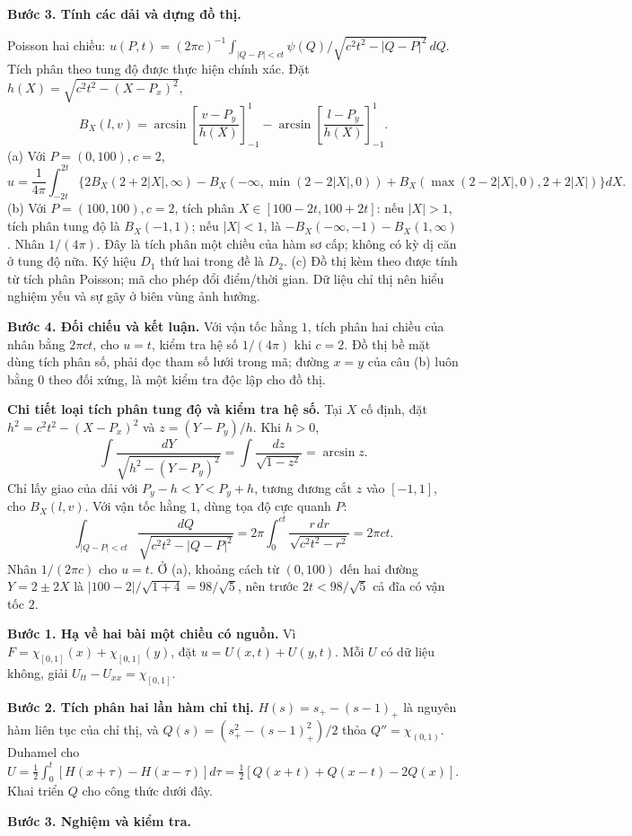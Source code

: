 \textbf{Bước 3. Tính các dải và dựng đồ thị.}

Poisson hai chiều: $u(P,t)=(2\pi c)^{-1}\int_{|Q-P|<ct}\psi(Q)/\sqrt{c^2t^2-|Q-P|^2}\,dQ$. Tích phân theo tung độ được thực hiện chính xác. Đặt $h(X)=\sqrt{c^2t^2-(X-P_x)^2}$,
\[B_X(l,v)=\arcsin\left[\frac{v-P_y}{h(X)}\right]_{-1}^1-\arcsin\left[\frac{l-P_y}{h(X)}\right]_{-1}^1.\]
(a) Với $P=(0,100),c=2$,
\[u=\frac1{4\pi}\int_{-2t}^{2t}\{2B_X(2+2|X|,\infty)-B_X(-\infty,\min(2-2|X|,0))+B_X(\max(2-2|X|,0),2+2|X|)\}dX.\]
(b) Với $P=(100,100),c=2$, tích phân $X\in[100-2t,100+2t]$: nếu $|X|>1$, tích phân tung độ là $B_X(-1,1)$; nếu $|X|<1$, là $-B_X(-\infty,-1)-B_X(1,\infty)$. Nhân $1/(4\pi)$. Đây là tích phân một chiều của hàm sơ cấp; không có kỳ dị căn ở tung độ nữa. Ký hiệu $D_1$ thứ hai trong đề là $D_2$.
(c) Đồ thị kèm theo được tính từ tích phân Poisson; mã cho phép đổi điểm/thời gian. Dữ liệu chỉ thị nên hiểu nghiệm yếu và sự gãy ở biên vùng ảnh hưởng.

\textbf{Bước 4. Đối chiếu và kết luận.} Với vận tốc hằng $1$, tích phân hai chiều của nhân bằng $2\pi ct$, cho $u=t$, kiểm tra hệ số $1/(4\pi)$ khi $c=2$. Đồ thị bề mặt dùng tích phân số, phải đọc tham số lưới trong mã; đường $x=y$ của câu (b) luôn bằng $0$ theo đối xứng, là một kiểm tra độc lập cho đồ thị.

\textbf{Chi tiết loại tích phân tung độ và kiểm tra hệ số.} Tại $X$ cố định, đặt $h^2=c^2t^2-(X-P_x)^2$ và $z=(Y-P_y)/h$. Khi $h>0$,
\[\int\frac{dY}{\sqrt{h^2-(Y-P_y)^2}}
=\int\frac{dz}{\sqrt{1-z^2}}=\arcsin z.\]
Chỉ lấy giao của dải với $P_y-h<Y<P_y+h$, tương đương cắt $z$ vào $[-1,1]$, cho $B_X(l,v)$. Với vận tốc hằng $1$, dùng tọa độ cực quanh $P$:
\[\int_{|Q-P|<ct}\frac{dQ}{\sqrt{c^2t^2-|Q-P|^2}}
=2\pi\int_0^{ct}\frac{r\,dr}{\sqrt{c^2t^2-r^2}}
=2\pi ct.\]
Nhân $1/(2\pi c)$ cho $u=t$. Ở (a), khoảng cách từ $(0,100)$ đến hai đường $Y=2\pm2X$ là $|100-2|/\sqrt{1+4}=98/\sqrt5$, nên trước $2t<98/\sqrt5$ cả đĩa có vận tốc $2$.

\textbf{Bước 1. Hạ về hai bài một chiều có nguồn.} Vì $F=\chi_{[0,1]}(x)+\chi_{[0,1]}(y)$, đặt $u=U(x,t)+U(y,t)$. Mỗi $U$ có dữ liệu không, giải $U_{tt}-U_{xx}=\chi_{[0,1]}$.

\textbf{Bước 2. Tích phân hai lần hàm chỉ thị.} $H(s)=s_+-(s-1)_+$ là nguyên hàm liên tục của chỉ thị, và $Q(s)=(s_+^2-(s-1)_+^2)/2$ thỏa $Q''=\chi_{(0,1)}$. Duhamel cho $U=\frac12\int_0^t[H(x+\tau)-H(x-\tau)]d\tau=\frac12[Q(x+t)+Q(x-t)-2Q(x)]$. Khai triển $Q$ cho công thức dưới đây.

\textbf{Bước 3. Nghiệm và kiểm tra.}

